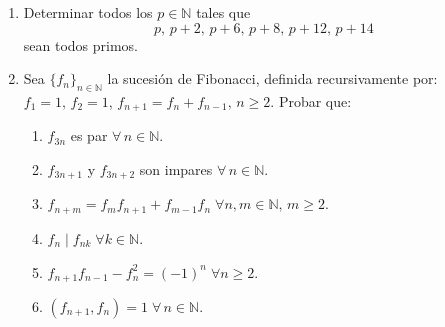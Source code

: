 \documentclass[a4paper,12pt,twoside,spanish,reqno]{amsbook}
\numberwithin{equation}{section}
\newcommand \N{{\mathbb N}}
\begin{document}
\begin{enumerate}
\item Determinar todos los $p\in\N$ tales que
\[ p,\, p+2,\, p+6,\, p+8,\, p+12,\, p+14 \]
sean todos primos.




\item  Sea $\{f_n\}_{n\in\N}$ la sucesi\'on de Fibonacci, definida recursivamente por: $f_1=1,\, f_2=1$, $f_{n+1}=f_{n}+f_{n-1},\, n\geq 2$. Probar que:
\begin{enumerate}
\item $f_{3n}$ es par $\forall\, n\in\N$.
\item $f_{3n+1}$ y $f_{3n+2}$ son impares $\forall\, n\in\N$.
\item $f_{n+m}=f_mf_{n+1}+f_{m-1}f_n\; \forall n,m\in\N,\, m\geq 2$.
\item $f_n\mid f_{nk}\;  \forall k\in\N$.
\item $f_{n+1}f_{n-1}-f_n^2=(-1)^n\; \forall n\geq 2$.
\item $(f_{n+1},f_n)=1\; \forall\, n\in\N$.
\end{enumerate}



\end{enumerate}
\end{document}
